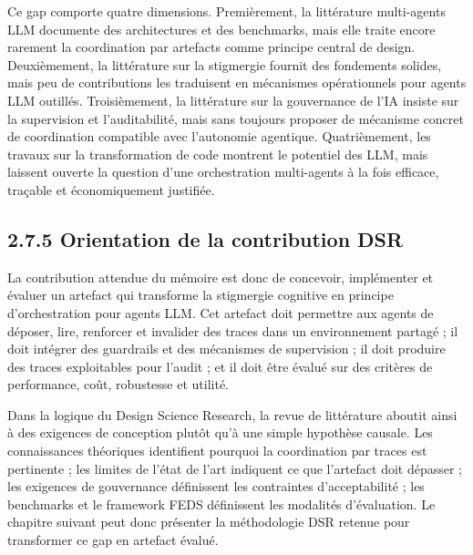 Ce gap comporte quatre dimensions. Premièrement, la littérature multi-agents LLM documente des architectures et des benchmarks, mais elle traite encore rarement la coordination par artefacts comme principe central de design. Deuxièmement, la littérature sur la stigmergie fournit des fondements solides, mais peu de contributions les traduisent en mécanismes opérationnels pour agents LLM outillés. Troisièmement, la littérature sur la gouvernance de l'IA insiste sur la supervision et l'auditabilité, mais sans toujours proposer de mécanisme concret de coordination compatible avec l'autonomie agentique. Quatrièmement, les travaux sur la transformation de code montrent le potentiel des LLM, mais laissent ouverte la question d'une orchestration multi-agents à la fois efficace, traçable et économiquement justifiée.

\subsection{2.7.5 Orientation de la contribution DSR}\label{orientation-de-la-contribution-dsr}

La contribution attendue du mémoire est donc de concevoir, implémenter et évaluer un artefact qui transforme la stigmergie cognitive en principe d'orchestration pour agents LLM. Cet artefact doit permettre aux agents de déposer, lire, renforcer et invalider des traces dans un environnement partagé ; il doit intégrer des guardrails et des mécanismes de supervision ; il doit produire des traces exploitables pour l'audit ; et il doit être évalué sur des critères de performance, coût, robustesse et utilité.

Dans la logique du Design Science Research, la revue de littérature aboutit ainsi à des exigences de conception plutôt qu'à une simple hypothèse causale. Les connaissances théoriques identifient pourquoi la coordination par traces est pertinente ; les limites de l'état de l'art indiquent ce que l'artefact doit dépasser ; les exigences de gouvernance définissent les contraintes d'acceptabilité ; les benchmarks et le framework FEDS définissent les modalités d'évaluation. Le chapitre suivant peut donc présenter la méthodologie DSR retenue pour transformer ce gap en artefact évalué.

